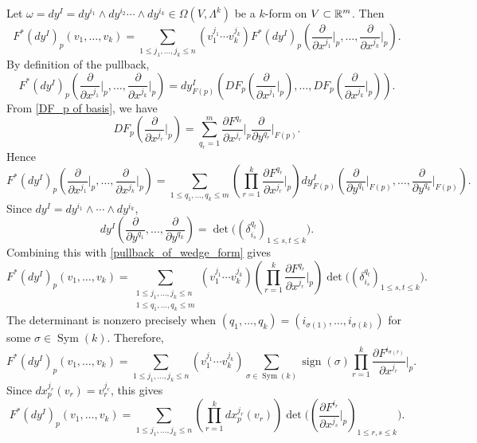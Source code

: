 Let $\omega=dy^I=dy^{i_1}\wedge dy^{i_2}\cdots\wedge dy^{i_k}\in\Omega(V,\Lambda^k)$ be a $k$-form on $V\subset\mathbb{R}^m$. Then
\begin{equation}\label{pullback_of_wedge_form}
F^*(dy^I)_p(v_1,\ldots,v_k)=\sum_{1\leq j_1,\ldots,j_k\leq n}(v_1^{j_1}\cdots v_k^{j_k})F^*(dy^I)_p\left(\frac{\partial}{\partial x^{j_1}}\Big|_p,\ldots,\frac{\partial}{\partial x^{j_k}}\Big|_p\right).
\end{equation}
By definition of the pullback,
\[
F^*(dy^I)_p\left(\frac{\partial}{\partial x^{j_1}}\Big|_p,\ldots,\frac{\partial}{\partial x^{j_k}}\Big|_p\right)
=dy^I_{F(p)}\left(DF_p\left(\frac{\partial}{\partial x^{j_1}}\Big|_p\right),\ldots,DF_p\left(\frac{\partial}{\partial x^{j_k}}\Big|_p\right)\right).
\]
From \ref{DF_p of basis}, we have
\[
DF_p\left(\frac{\partial}{\partial x^{j_r}}\Big|_p\right)=\sum_{q_r=1}^m\frac{\partial F^{q_r}}{\partial x^{j_r}}\Big|_p\frac{\partial}{\partial y^{q_r}}\Big|_{F(p)}.
\]
Hence
\[
F^*(dy^I)_p\left(\frac{\partial}{\partial x^{j_1}}\Big|_p,\ldots,\frac{\partial}{\partial x^{j_k}}\Big|_p\right)
=\sum_{1\leq q_1,\ldots,q_k\leq m}\left(\prod_{r=1}^k\frac{\partial F^{q_r}}{\partial x^{j_r}}\Big|_p\right)dy^I_{F(p)}\left(\frac{\partial}{\partial y^{q_1}}\Big|_{F(p)},\ldots,\frac{\partial}{\partial y^{q_k}}\Big|_{F(p)}\right).
\]
Since $dy^I=dy^{i_1}\wedge\cdots\wedge dy^{i_k}$,
\[
dy^I\left(\frac{\partial}{\partial y^{q_1}},\ldots,\frac{\partial}{\partial y^{q_k}}\right)=\det\Big((\delta_{i_s}^{q_t})_{1\leq s,t\leq k}\Big).
\]
Combining this with \ref{pullback_of_wedge_form} gives
\begin{equation}\label{pullback_of_basis_k_form_expansion}
F^*(dy^I)_p(v_1,\ldots,v_k)=\sum_{\substack{1\leq j_1,\ldots,j_k\leq n\\1\leq q_1,\ldots,q_k\leq m}}(v_1^{j_1}\cdots v_k^{j_k})\left(\prod_{r=1}^k\frac{\partial F^{q_r}}{\partial x^{j_r}}\Big|_p\right)\det\Big((\delta_{i_s}^{q_t})_{1\leq s,t\leq k}\Big).
\end{equation}
The determinant is nonzero precisely when $(q_1,\ldots,q_k)=(i_{\sigma(1)},\ldots,i_{\sigma(k)})$ for some $\sigma\in\operatorname{Sym}(k)$. Therefore,
\[
F^*(dy^I)_p(v_1,\ldots,v_k)=\sum_{1\leq j_1,\ldots,j_k\leq n}(v_1^{j_1}\cdots v_k^{j_k})\sum_{\sigma\in\operatorname{Sym}(k)}\operatorname{sign}(\sigma)\prod_{r=1}^k\frac{\partial F^{i_{\sigma(r)}}}{\partial x^{j_r}}\Big|_p.
\]
Since $dx^{j_r}_p(v_r)=v_r^{j_r}$, this gives
\[
F^*(dy^I)_p(v_1,\ldots,v_k)=\sum_{1\leq j_1,\ldots,j_k\leq n}\left(\prod_{r=1}^kdx^{j_r}_p(v_r)\right)\det\Bigg(\left(\frac{\partial F^{i_r}}{\partial x^{j_s}}\Big|_p\right)_{1\leq r,s\leq k}\Bigg).
\]
